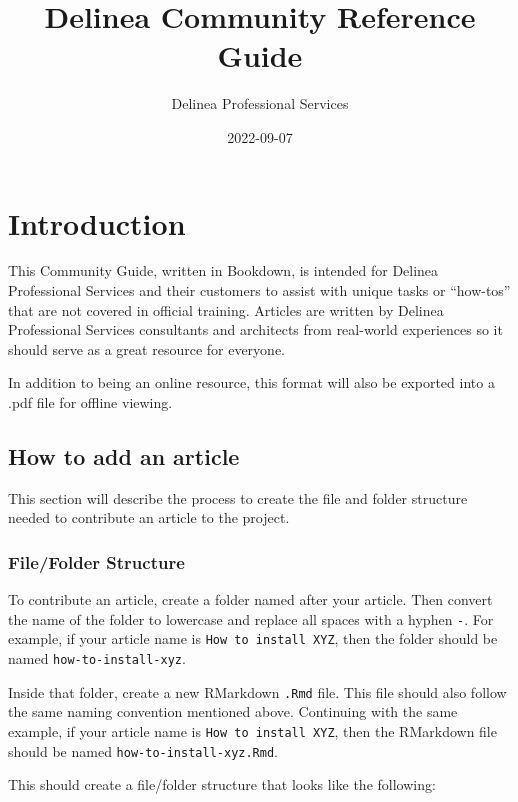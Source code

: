 \documentclass[
]{book}
\title{Delinea Community Reference Guide}
\author{Delinea Professional Services}
\date{2022-09-07}
\begin{document}
\maketitle

{
\setcounter{tocdepth}{1}
\tableofcontents
}
\hypertarget{introduction}{%
\chapter{Introduction}\label{introduction}}

This Community Guide, written in Bookdown, is intended for Delinea Professional Services and their customers to assist with unique tasks or ``how-tos'' that are not covered in official training. Articles are written by Delinea Professional Services consultants and architects from real-world experiences so it should serve as a great resource for everyone.

In addition to being an online resource, this format will also be exported into a .pdf file for offline viewing.

\hypertarget{how-to-add-an-article}{%
\section{How to add an article}\label{how-to-add-an-article}}

This section will describe the process to create the file and folder structure needed to contribute an article to the project.

\hypertarget{filefolder-structure}{%
\subsection{File/Folder Structure}\label{filefolder-structure}}

To contribute an article, create a folder named after your article. Then convert the name of the folder to lowercase and replace all spaces with a hyphen \texttt{-}. For example, if your article name is \texttt{How\ to\ install\ XYZ}, then the folder should be named \texttt{how-to-install-xyz}.

Inside that folder, create a new RMarkdown \texttt{.Rmd} file. This file should also follow the same naming convention mentioned above. Continuing with the same example, if your article name is \texttt{How\ to\ install\ XYZ}, then the RMarkdown file should be named \texttt{how-to-install-xyz.Rmd}.

This should create a file/folder structure that looks like the following:
\end{document}

